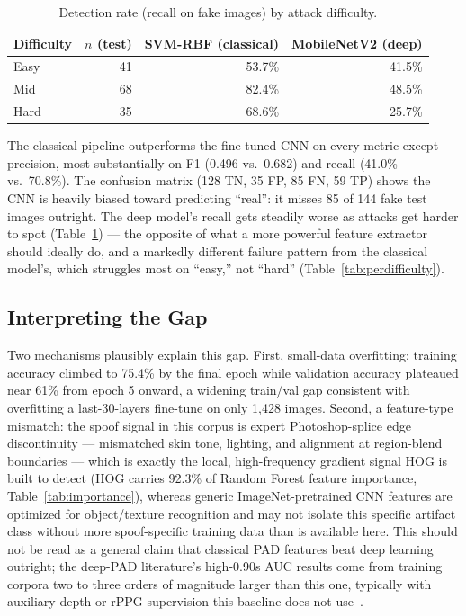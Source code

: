 \documentclass[11pt]{article}
\begin{document}
\begin{table}[htbp]
\centering
\caption{Detection rate (recall on fake images) by attack difficulty.}
\label{tab:deepdifficulty}
\begin{tabular}{lrrr}
\toprule
Difficulty & $n$ (test) & SVM-RBF (classical) & MobileNetV2 (deep) \\
\midrule
Easy & 41 & 53.7\% & 41.5\% \\
Mid & 68 & 82.4\% & 48.5\% \\
Hard & 35 & 68.6\% & 25.7\% \\
\bottomrule
\end{tabular}
\end{table}

The classical pipeline outperforms the fine-tuned CNN on every metric except precision, most substantially on F1 (0.496 vs.\ 0.682) and recall (41.0\% vs.\ 70.8\%). The confusion matrix (128 TN, 35 FP, 85 FN, 59 TP) shows the CNN is heavily biased toward predicting ``real'': it misses 85 of 144 fake test images outright. The deep model's recall gets steadily worse as attacks get harder to spot (Table~\ref{tab:deepdifficulty}) --- the opposite of what a more powerful feature extractor should ideally do, and a markedly different failure pattern from the classical model's, which struggles most on ``easy,'' not ``hard'' (Table~\ref{tab:perdifficulty}).

\subsection{Interpreting the Gap}

Two mechanisms plausibly explain this gap. First, small-data overfitting: training accuracy climbed to 75.4\% by the final epoch while validation accuracy plateaued near 61\% from epoch 5 onward, a widening train/val gap consistent with overfitting a last-30-layers fine-tune on only 1,428 images. Second, a feature-type mismatch: the spoof signal in this corpus is expert Photoshop-splice edge discontinuity --- mismatched skin tone, lighting, and alignment at region-blend boundaries --- which is exactly the local, high-frequency gradient signal HOG is built to detect (HOG carries 92.3\% of Random Forest feature importance, Table~\ref{tab:importance}), whereas generic ImageNet-pretrained CNN features are optimized for object/texture recognition and may not isolate this specific artifact class without more spoof-specific training data than is available here. This should not be read as a general claim that classical PAD features beat deep learning outright; the deep-PAD literature's high-0.90s AUC results come from training corpora two to three orders of magnitude larger than this one, typically with auxiliary depth or rPPG supervision this baseline does not use~\cite{liu2018,yu2020}.
\end{document}
